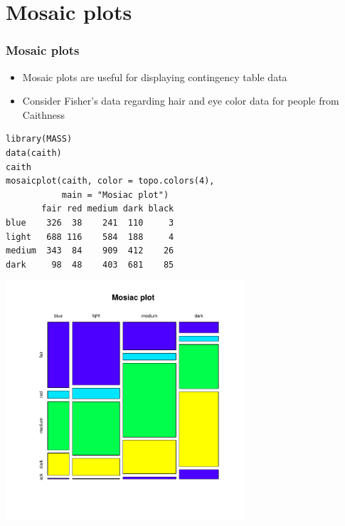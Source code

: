 \documentclass[aspectratio=169]{beamer}
\begin{document}
\section{Mosaic plots}
\begin{frame}[fragile]\frametitle{Mosaic plots}
\begin{itemize}
\item Mosaic plots are useful for displaying contingency table data
\item Consider Fisher's data regarding hair and eye color data for people from Caithness
\end{itemize}
\begin{verbatim}
library(MASS)
data(caith)
caith
mosaicplot(caith, color = topo.colors(4), 
           main = "Mosiac plot")
       fair red medium dark black
blue    326  38    241  110     3
light   688 116    584  188     4
medium  343  84    909  412    26
dark     98  48    403  681    85
\end{verbatim}
\end{frame}

\begin{frame}
  \includegraphics[width=3.5in]{mosaic.pdf}
\end{frame}
\end{document}
